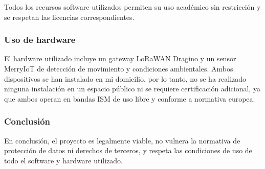 Todos los recursos software utilizados permiten su uso académico sin restricción y se respetan las licencias correspondientes.

\subsubsection{Uso de hardware}

El hardware utilizado incluye un gateway LoRaWAN Dragino y un sensor MerryIoT de detección de movimiento y condiciones ambientales. Ambos dispositivos se han instalado en mi domicilio, por lo tanto, no se ha realizado ninguna instalación en un espacio público ni se requiere certificación adicional, ya que ambos operan en bandas ISM de uso libre y conforme a normativa europea.

\subsubsection{Conclusión}

En conclusión,  el proyecto es legalmente viable, no vulnera la normativa de protección de datos ni derechos de terceros, y respeta las condiciones de uso de todo el software y hardware utilizado.



